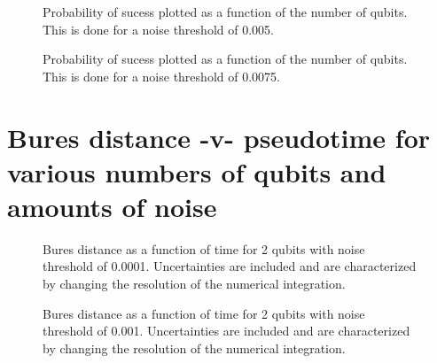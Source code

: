 \pagebreak

\begin{figure}[h]
\begin{center}
\end{center}
\caption{Probability of sucess plotted as a function of the number of qubits. This
is done for a noise threshold of 0.005.}
\end{figure}

\pagebreak

\begin{figure}[h]
\begin{center}
\end{center}
\caption{Probability of sucess plotted as a function of the number of qubits. This
is done for a noise threshold of 0.0075.}
\end{figure}


\pagebreak

\vfill
\section{Bures distance -v- pseudotime for various numbers of qubits and
amounts of noise}
\vfill

\pagebreak



\begin{figure}[h]
\begin{center}
\end{center}
\caption{Bures distance as a function of time for 2 qubits with noise
threshold of 0.0001.  Uncertainties are included and are characterized 
by changing the resolution of the numerical integration.}
\end{figure}

\pagebreak

\begin{figure}[h]
\begin{center}
\end{center}
\caption{Bures distance as a function of time for 2 qubits with noise
threshold of 0.001.  Uncertainties are included and are characterized 
by changing the resolution of the numerical integration.}
\end{figure}

